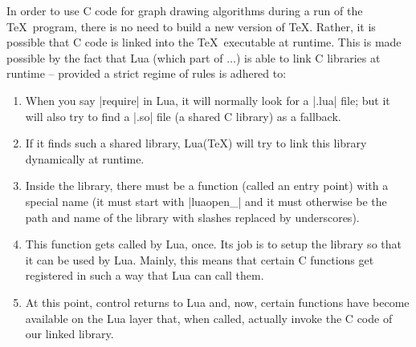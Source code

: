 In order to use C code for graph drawing algorithms during a run of the \TeX\
program, there is no need to build a new version of \TeX. Rather, it is
possible that C code is linked into the \TeX\ executable at runtime. This is
made possible by the fact that Lua (which part of \hologo{LuaTeX}$\dots$) is able to
link C libraries at runtime -- provided a strict regime of rules is adhered to:
%
\begin{enumerate}
    \item When you say |require| in Lua, it will normally look for a |.lua|
        file; but it will also try to find a |.so| file (a shared C library) as
        a fallback.
    \item If it finds such a shared library, Lua(\TeX) will try to link this
        library dynamically at runtime.
    \item Inside the library, there must be a function (called an entry point)
        with a special name (it must start with |luaopen_| and it must
        otherwise be the path and name of the library with slashes replaced by
        underscores).
    \item This function gets called by Lua, once. Its job is to setup the
        library so that it can be used by Lua. Mainly, this means that certain
        C functions get registered in such a way that Lua can call them.
    \item At this point, control returns to Lua and, now, certain functions
        have become available on the Lua layer that, when called, actually
        invoke the C code of our linked library.
\end{enumerate}

